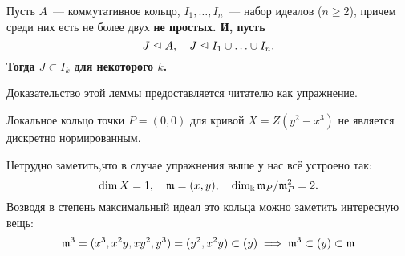 	   \begin{lemma} 
	   	Пусть $A$~--- коммутативное кольцо, $I_1, \ldots, I_n$~--- набор идеалов ($n \ge 2$), причем среди них есть не более двух \bf{не} простых. И, пусть
	   	\[
	   		J \trianglelefteq A, \quad J \trianglelefteq I_1 \cup \ldots \cup I_n.
	   	\]
	   	Тогда $J \subset I_k$ для некоторого $k$. 
	   \end{lemma}

	   Доказательство этой леммы предоставляется читателю как упражнение. 

	   	\begin{exercise}
	   		Локальное кольцо точки $P = (0, 0)$ для кривой $X = Z(y^2 - x^3)$ не является дискретно нормированным.  
	   	\end{exercise}

	   	\begin{example}
   		Нетрудно заметить,что в случае упражнения выше у нас всё устроено так: 
   		\[
   			\dim{X} = 1, \quad \mathfrak{m} = (x, y), \quad \dim_{\Bbbk} \mathfrak{m}_P/\mathfrak{m}_P^2 = 2. 	
   		\]
		Возводя в степень максимальный идеал это кольца можно заметить интересную вещь: 
	   	\[
	   		\mathfrak{m}^3 = (x^3, x^2 y, xy^2, y^3) = (y^2, x^2 y) \subset (y) \implies \mathfrak{m}^3 \subset (y) \subset \mathfrak{m}
	   	\]
	   	\end{example}
	   	

